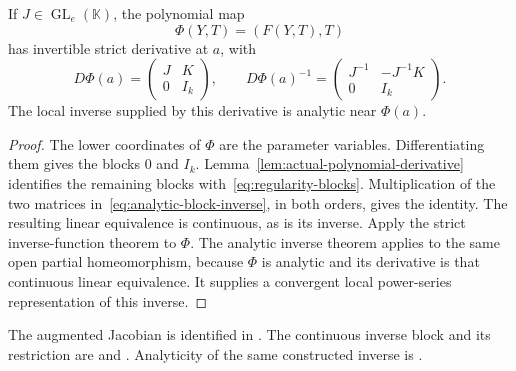 \begin{lemma}
\label{lem:augmented-analytic-inverse}
If $J\in\operatorname{GL}_e(\mathbb K)$, the polynomial map
\[
 \Phi(Y,T)=(F(Y,T),T)
\]
has invertible strict derivative at $a$, with
\begin{equation}
 D\Phi(a)=\begin{pmatrix}J&K\\0&I_k\end{pmatrix},\qquad
 D\Phi(a)^{-1}=\begin{pmatrix}J^{-1}&-J^{-1}K\\0&I_k\end{pmatrix}.
 \label{eq:analytic-block-inverse}
\end{equation}
The local inverse supplied by this derivative is analytic near $\Phi(a)$.
\end{lemma}
\begin{proof}
The lower coordinates of $\Phi$ are the parameter variables. Differentiating
them gives the blocks $0$ and $I_k$. Lemma~\ref{lem:actual-polynomial-derivative}
identifies the remaining blocks with~\eqref{eq:regularity-blocks}.
Multiplication of the two matrices in~\eqref{eq:analytic-block-inverse},
in both orders, gives the identity. The resulting linear equivalence is
continuous, as is its inverse. Apply the strict inverse-function theorem to
$\Phi$. The analytic inverse theorem applies to the same open partial
homeomorphism, because $\Phi$ is analytic and its derivative is that
continuous linear equivalence. It supplies a convergent local power-series
representation of this inverse.
\end{proof}
The augmented Jacobian is identified in
.
The continuous inverse block and its restriction are
 and
.
Analyticity of the same constructed inverse is
.

